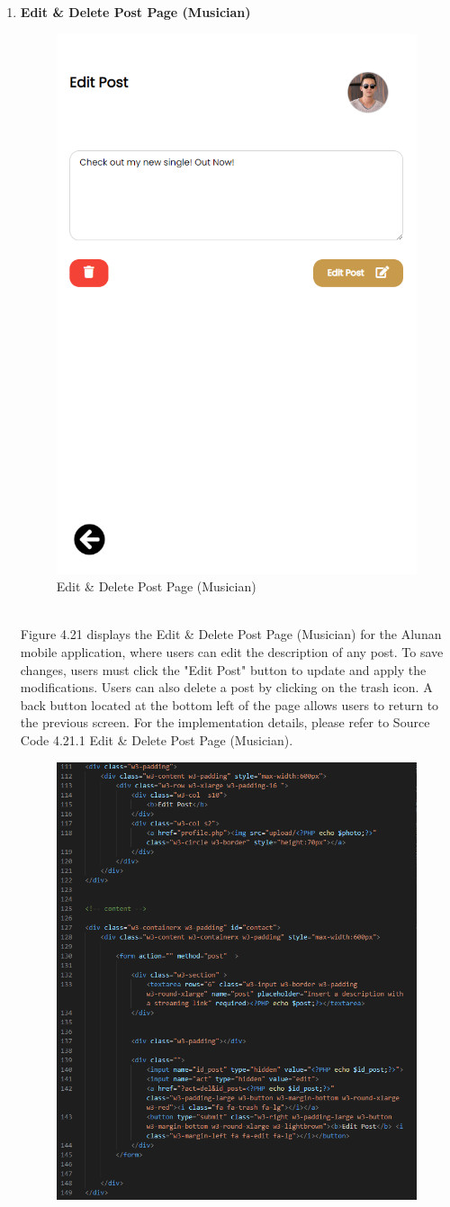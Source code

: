 \begin{enumerate}[1.]
    \item \textbf{Edit \& Delete Post Page (Musician)}
    \begin{figure}[h]
        \centering
        \includegraphics[width=0.5\linewidth]{mainmatter/images/frontend/ss/Edit-Delete Post (Musician).png}
        \caption{Edit \& Delete Post Page (Musician)}
        \label{fig:myfig60}
    \end{figure} \\
    Figure 4.21 displays the Edit \& Delete Post Page (Musician) for the Alunan mobile application, where users can edit the description of any post. To save changes, users must click the "Edit Post" button to update and apply the modifications. Users can also delete a post by clicking on the trash icon. A back button located at the bottom left of the page allows users to return to the previous screen. For the implementation details, please refer to Source Code 4.21.1 Edit \& Delete Post Page (Musician).
    \clearpage
    \begin{figure}[h]
        \centering
        \includegraphics[width=0.8\linewidth]{mainmatter/images/frontend/code/meditpost.png}

\end{figure}
\end{enumerate}
